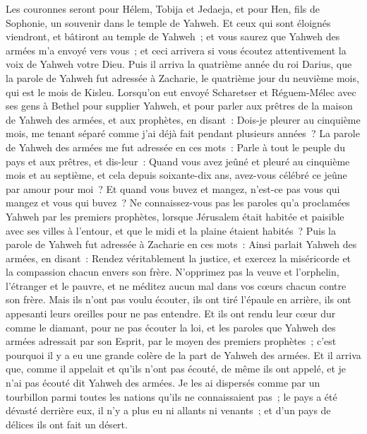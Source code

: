 \begin{multicols}{2}
Les couronnes seront pour Hélem, Tobija et Jedaeja, et pour Hen, fils de Sophonie, un souvenir dans le temple de Yahweh.
 Et ceux qui sont éloignés viendront, et bâtiront au temple de Yahweh~; et vous saurez que Yahweh des armées m'a envoyé vers vous~; et ceci arrivera si vous écoutez attentivement la voix de Yahweh votre Dieu.
\VerseOne{}Puis il arriva la quatrième année du roi Darius, que la parole de Yahweh fut adressée à Zacharie, le quatrième jour du neuvième mois, qui est le mois de Kisleu.
Lorsqu'on eut envoyé Scharetser et Réguem-Mélec avec ses gens à Bethel pour supplier Yahweh,
et pour parler aux prêtres de la maison de Yahweh des armées, et aux prophètes, en disant~: Dois-je pleurer au cinquième mois, me tenant séparé comme j'ai déjà fait pendant plusieurs années~?
La parole de Yahweh des armées me fut adressée en ces mots~:
Parle à tout le peuple du pays et aux prêtres, et dis-leur~: Quand vous avez jeûné et pleuré au cinquième mois et au septième, et cela depuis soixante-dix ans, avez-vous célébré ce jeûne par amour pour moi~?
Et quand vous buvez et mangez, n'est-ce pas vous qui mangez et vous qui buvez~?
Ne connaissez-vous pas les paroles qu'a proclamées Yahweh par les premiers prophètes, lorsque Jérusalem était habitée et paisible avec ses villes à l'entour, et que le midi et la plaine étaient habités~?
Puis la parole de Yahweh fut adressée à Zacharie en ces mots~:
Ainsi parlait Yahweh des armées, en disant~: Rendez véritablement la justice, et exercez la miséricorde et la compassion chacun envers son frère.
N'opprimez pas la veuve et l'orphelin, l'étranger et le pauvre, et ne méditez aucun mal dans vos cœurs chacun contre son frère.
Mais ils n'ont pas voulu écouter, ils ont tiré l'épaule en arrière, ils ont appesanti leurs oreilles pour ne pas entendre.
Et ils ont rendu leur cœur dur comme le diamant, pour ne pas écouter la loi, et les paroles que Yahweh des armées adressait par son Esprit, par le moyen des premiers prophètes~; c'est pourquoi il y a eu une grande colère de la part de Yahweh des armées.
Et il arriva que, comme il appelait et qu'ils n'ont pas écouté, de même ils ont appelé, et je n'ai pas écouté dit Yahweh des armées.
Je les ai dispersés comme par un tourbillon parmi toutes les nations qu'ils ne connaissaient pas~; le pays a été dévasté derrière eux, il n'y a plus eu ni allants ni venants~; et d'un pays de délices ils ont fait un désert.

\end{multicols}
